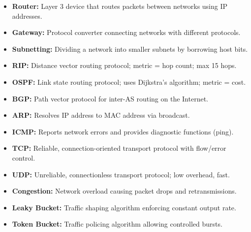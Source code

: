 \documentclass[12pt,a4paper]{article}
\begin{document}
\begin{tcolorbox}[defbox, title={\textbf{One-Line Definitions}}]
\begin{itemize}[leftmargin=*, itemsep=3pt, topsep=0pt]
  \item \textbf{Router:} Layer 3 device that routes packets between networks using IP addresses.
  \item \textbf{Gateway:} Protocol converter connecting networks with different protocols.
  \item \textbf{Subnetting:} Dividing a network into smaller subnets by borrowing host bits.
  \item \textbf{RIP:} Distance vector routing protocol; metric = hop count; max 15 hops.
  \item \textbf{OSPF:} Link state routing protocol; uses Dijkstra's algorithm; metric = cost.
  \item \textbf{BGP:} Path vector protocol for inter-AS routing on the Internet.
  \item \textbf{ARP:} Resolves IP address to MAC address via broadcast.
  \item \textbf{ICMP:} Reports network errors and provides diagnostic functions (ping).
  \item \textbf{TCP:} Reliable, connection-oriented transport protocol with flow/error control.
  \item \textbf{UDP:} Unreliable, connectionless transport protocol; low overhead, fast.
  \item \textbf{Congestion:} Network overload causing packet drops and retransmissions.
  \item \textbf{Leaky Bucket:} Traffic shaping algorithm enforcing constant output rate.
  \item \textbf{Token Bucket:} Traffic policing algorithm allowing controlled bursts.
\end{itemize}
\end{tcolorbox}

\vspace{6pt}
\end{document}
